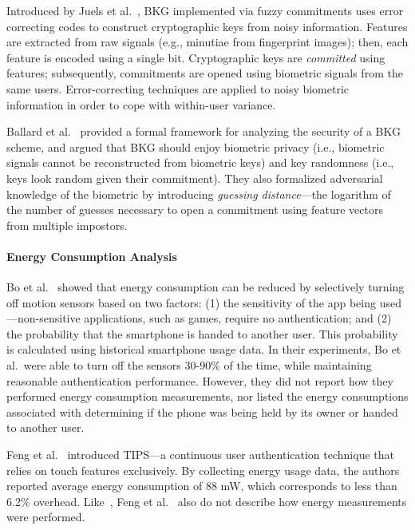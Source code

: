 Introduced by Juels et al.~\cite{fuzzy_commitment}, BKG implemented via fuzzy commitments uses error correcting codes to construct cryptographic keys from noisy information. 
Features are extracted from raw signals (e.g., minutiae from fingerprint images); 
then, each feature is encoded using a single bit. Cryptographic keys are {\em committed} using features; subsequently, commitments are opened using biometric signals from the same users. Error-correcting techniques are 
applied to noisy biometric information in order to cope with within-user variance.%

%
%
%
%
%
%


%
%
%
%
%

Ballard et al.~\cite{bal08} provided a formal framework for analyzing the security of a BKG scheme, and argued that BKG should enjoy biometric privacy (i.e., biometric signals cannot be reconstructed from biometric keys) and key randomness (i.e., keys look random given their commitment). They also formalized adversarial knowledge of the biometric by introducing \emph{guessing distance}---the logarithm of the number of guesses necessary to open a commitment using feature vectors from multiple impostors.

%
%
%
%
%
%
%



\paragraph{Energy Consumption Analysis}
Bo et al.~\cite{bo2013} showed that energy consumption can be reduced by selectively turning off motion 
sensors based on two factors: (1) the sensitivity of the app being used---non-sensitive applications, such as games, require no authentication; and (2) the probability that the smartphone is handed to another user. This probability is calculated using historical smartphone usage data. 
In their experiments, Bo et al.~were able to turn off the sensors 30-90\% of the time, while maintaining reasonable authentication performance. However, they did not report how they performed energy consumption measurements, nor listed the  
energy consumptions associated with determining if the phone was being held by its owner or handed to another user. 

Feng et al.~\cite{Feng:2014:TCI:2565585.2565592} introduced TIPS---a continuous user authentication technique that relies on touch features exclusively. By collecting energy usage data, the authors reported average energy consumption of 88 mW, which corresponds to less than 6.2\% overhead. Like~\cite{bo2013},  Feng et al.~\cite{Feng:2014:TCI:2565585.2565592} also do not describe how energy measurements were performed.

